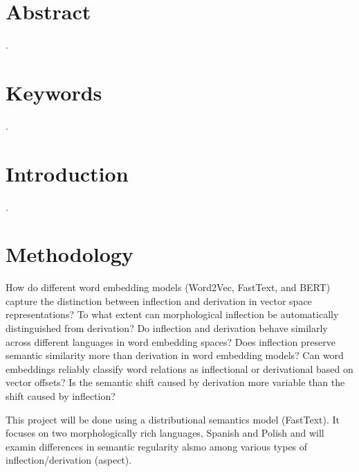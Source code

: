 \documentclass[12pt, a4paper]{article}
\begin{document}
\section*{Abstract} %
.

\section*{Keywords} %
.

\newpage
\tableofcontents
\newpage


\section{Introduction}
.

\section{Methodology}
How do different word embedding models (Word2Vec, FastText, and BERT) capture the distinction between inflection and derivation in vector space representations?
To what extent can morphological inflection be automatically distinguished from derivation?
Do inflection and derivation behave similarly across different languages in word embedding spaces?
Does inflection preserve semantic similarity more than derivation in word embedding models?
Can word embeddings reliably classify word relations as inflectional or derivational based on vector offsets? 
Is the semantic shift caused by derivation more variable than the shift caused by inflection?

This project will be done using a distributional semantics model (FastText). It focuses on two morphologically rich languages, Spanish and Polish and will examin differences in semantic regularity alsmo among various types of inflection/derivation (aspect).

\end{document}
